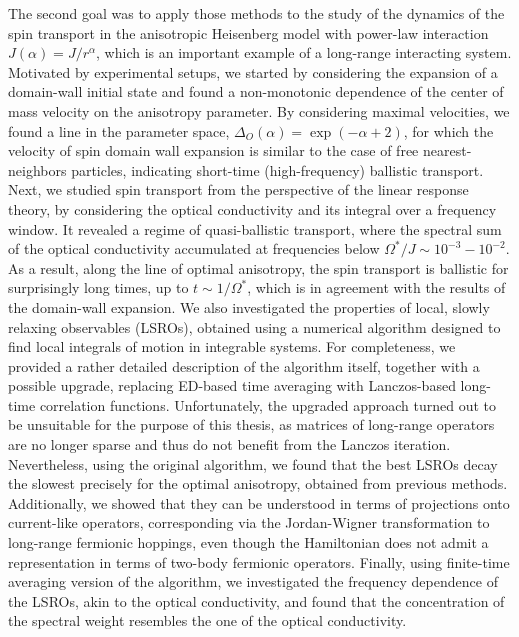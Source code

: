 The second goal was to apply those methods to the study of the dynamics of the spin transport in the anisotropic
Heisenberg model with power-law interaction \(J(\alpha) = J/r^{\alpha}\), which is an important example of a
long-range interacting system. Motivated by experimental setups, we started by considering the
expansion of a domain-wall initial state and found a non-monotonic dependence of the
center of mass velocity on the anisotropy parameter. By considering maximal velocities,
we found a line in the parameter space, \(\Delta_O(\alpha) = \exp(-\alpha + 2)\),
for which the velocity of spin domain wall expansion is similar to the case of free
nearest-neighbors particles, indicating short-time (high-frequency) ballistic transport.
Next, we studied spin transport from the perspective of the linear response theory,
by considering the optical conductivity and its integral over a frequency window.
It revealed a regime of quasi-ballistic transport, where the spectral sum
of the optical conductivity accumulated at frequencies below \(\Omega^{\ast}/J \sim
10^{-3}-10^{-2}\). As a result, along the line of optimal anisotropy, the spin
transport is ballistic for surprisingly long times, up to \(t \sim 1/\Omega^{\ast}\),
which is in agreement with the results of the domain-wall expansion.
We also investigated the properties of local, slowly relaxing observables
(LSROs), obtained using a numerical algorithm designed to find local integrals of
motion in integrable systems. For completeness, we provided a rather detailed
description of the algorithm itself, together with a possible upgrade, replacing
ED-based time averaging with Lanczos-based long-time correlation functions.
Unfortunately, the upgraded approach turned out to be unsuitable for the purpose of
this thesis, as matrices of long-range operators are no longer sparse and thus do not
benefit from the Lanczos iteration. Nevertheless, using the original algorithm, we
found that the best LSROs decay the slowest precisely for the optimal anisotropy, obtained from
previous methods. Additionally, we showed that they can be understood in terms of projections onto
current-like operators, corresponding via the Jordan-Wigner transformation to long-range fermionic hoppings,
even though the Hamiltonian does not admit a representation in terms of two-body fermionic operators.
Finally, using finite-time averaging version of the algorithm, we investigated the frequency dependence
of the LSROs, akin to the optical conductivity, and found that the concentration of the spectral weight
resembles the one of the optical conductivity.

